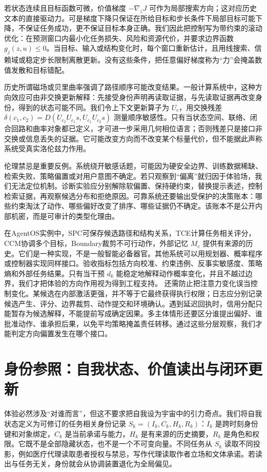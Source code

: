 若状态连续且目标函数可微，价值梯度 $-\nabla_z J$ 可作为局部搜索方向；这对应历史文本的直接驱动力。可是梯度下降只保证在所给目标和步长条件下局部目标可能下降，不保证任务成功，更不保证目标本身正确。我们因此把控制写为带约束的滚动优化：在预测窗口内最小化任务损失、风险和资源代价，并要求边界函数 $g_j(z,u)\leq0$。当目标、输入或结构变化时，每个窗口重新估计，且用线搜索、信赖域或稳定步长限制离散更新。没有这些条件，把任意偏好梯度称为“力”会掩盖数值发散和目标错配。

历史所谓磁场或贝里曲率强调了路径顺序可能改变结果。一般计算系统中，这种方向效应可由非交换更新解释：先接受身份声明再读取证据，与先读取证据再改变身份，得到的状态可能不同。我们令上下文更新算子为 $U_c$，用交换残差 $\delta(c_1,c_2)=D(U_{c_2}U_{c_1}s,U_{c_1}U_{c_2}s)$ 测量顺序敏感性。只有当状态空间、联络、闭合回路和曲率对象都已定义，才可进一步采用几何相位语言；否则残差只是接口非交换或信息丢失的证据。它可能改变方向而不改变某个标量代价，但不能据此声称系统受真实洛伦兹力作用。

伦理禁忌是重要反例。系统绕开敏感话题，可能因为硬安全边界、训练数据稀缺、检索失败、策略偏置或对用户意图不确定。若只观察到“偏离”就归因于体验场，我们无法定位机制。诊断实验应分别解除软偏置、保持硬约束，替换提示表述，控制检索证据，再观察候选分布和拒绝原因。可靠系统还要输出受保护的决策账本：哪些约束淘汰了动作、哪些偏好改变了排序、哪些证据仍不确定。该账本不是公开内部机密，而是可审计的类型化理由。

在AgentOS实例中，SPC可保存候选路径和结构关系，TCE计算任务相关评分，CCM协调多个目标，Boundary裁剪不可行动作，外部记忆 $M_e$ 提供有来源的历史。它们是一种实现，不是一般智能必备器官。其他系统可以用规划器、概率程序或控制器实现同样接口。验收指标包括方向校准、约束违例、反事实敏感度、策略熵和外部任务结果。只有当干预 $d_k$ 能稳定地解释动作概率变化，并且不越过边界，我们才把体验的方向作用视为得到工程支持。
还需防止把注意力变化误当控制变化。某候选在内部激活更强，并不等于它最终获得执行权限；日志应分别记录候选产生、评分、边界裁剪、动作提交和环境确认。遇到延迟回执时，信用分配只能暂存为候选解释，不能提前写成确定因果。多主体情形还要区分谁提出偏好、谁批准动作、谁承担后果，以免平均策略掩盖责任转移。通过这些分层观察，我们才能判定方向偏置发生在哪个接口。

\section{身份参照：自我状态、价值读出与闭环更新}
\label{sec:section_7533}
体验必然涉及“对谁而言”，但这不要求把自我设为宇宙中的引力奇点。我们将自我状态定义为可修订的任务相关身份记录 $S_k=(I_k,C_k,H_k,R_k)$：$I_k$ 是跨时刻身份键和对象绑定，$C_k$ 是当前承诺与能力，$H_k$ 是有来源的历史摘要，$R_k$ 是角色和权限。它既不是全部隐藏状态，也不是一个不可变向量。不同任务从 $S_k$ 读取不同投影，例如医疗代理读取患者授权与禁忌，写作代理读取作者立场和文体承诺。若读出与任务无关，身份就会从协调装置退化为全局偏见。


